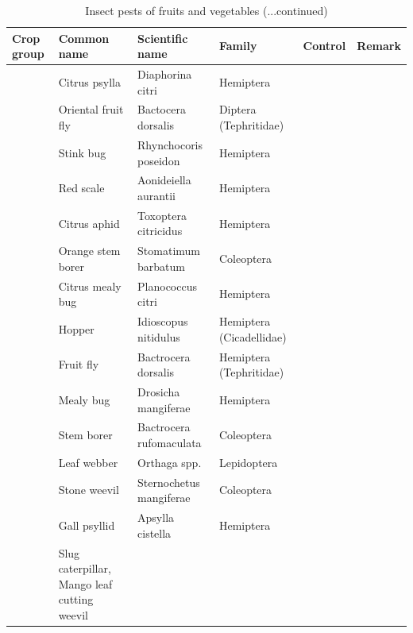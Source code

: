 \documentclass[10pt,dvipsnames,ignorenonframetext,aspectratio=169]{beamer}
\begin{document}
\begin{frame}{}
\protect\hypertarget{section-13}{}
\begin{table}

\caption{\label{tab:unnamed-chunk-1}Insect pests of fruits and vegetables (...continued)}
\centering
\fontsize{4}{6}\selectfont
\begin{tabular}[t]{>{\raggedright\arraybackslash}p{5em}>{\raggedright\arraybackslash}p{13em}>{\raggedright\arraybackslash}p{14em}>{\raggedright\arraybackslash}p{14em}>{\raggedright\arraybackslash}p{7em}>{\raggedright\arraybackslash}p{12em}}
\toprule
Crop group & Common name & Scientific name & Family & Control & Remark\\
\midrule
 & Citrus psylla & Diaphorina citri & Hemiptera &  & \\
\cmidrule{2-6}
 & Oriental fruit fly & Bactocera dorsalis & Diptera (Tephritidae) &  & \\
\cmidrule{2-6}
 & Stink bug & Rhynchocoris poseidon & Hemiptera &  & \\
\cmidrule{2-6}
 & Red scale & Aonideiella aurantii & Hemiptera &  & \\
\cmidrule{2-6}
 & Citrus aphid & Toxoptera citricidus & Hemiptera &  & \\
\cmidrule{2-6}
 & Orange stem borer & Stomatimum barbatum & Coleoptera &  & \\
\cmidrule{2-6}
\multirow{-7}{5em}{\raggedright\arraybackslash Citrus} & Citrus mealy bug & Planococcus citri & Hemiptera &  & \\
\cmidrule{1-6}
 & Hopper & Idioscopus nitidulus & Hemiptera (Cicadellidae) &  & \\
\cmidrule{2-6}
 & Fruit fly & Bactrocera dorsalis & Hemiptera (Tephritidae) &  & \\
\cmidrule{2-6}
 & Mealy bug & Drosicha mangiferae & Hemiptera &  & \\
\cmidrule{2-6}
 & Stem borer & Bactrocera rufomaculata & Coleoptera &  & \\
\cmidrule{2-6}
 & Leaf webber & Orthaga spp. & Lepidoptera &  & \\
\cmidrule{2-6}
 & Stone weevil & Sternochetus mangiferae & Coleoptera &  & \\
\cmidrule{2-6}
 & Gall psyllid & Apsylla cistella & Hemiptera &  & \\
\cmidrule{2-6}
\multirow{-8}{5em}{\raggedright\arraybackslash Mango} & Slug caterpillar, Mango leaf cutting weevil &  &  &  & \\
\bottomrule
\end{tabular}
\end{table}
\end{frame}
\end{document}
